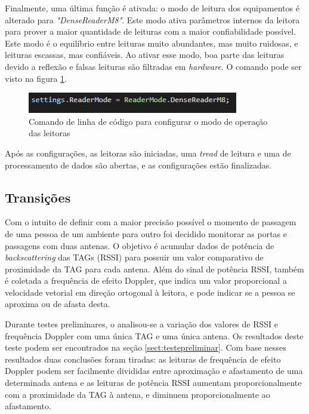   Finalmente, uma última função é ativada: o modo de leitura dos equipamentos é alterado para \textit{"DenseReaderM8"}. Este modo ativa parâmetros internos da leitora para prover a maior quantidade de leituras com a maior confiabilidade possível. Este modo é o equilíbrio entre leituras muito abundantes, mas muito ruidosas, e leituras escassas, mas confiáveis. Ao ativar esse modo, boa parte das leituras devido a reflexão e falsas leituras são filtradas em \textit{hardware}. O comando pode ser visto na figura \ref{fig:readermode_settings}.

 \begin{figure}[H]
    \centering
    \includegraphics[width=0.6\linewidth]{figs/Metodologia/readermode_settings.PNG}
    \caption{Comando de linha de código para configurar o modo de operação das leitoras}
    \label{fig:readermode_settings}
\end{figure}

  Após as configurações, as leitoras são iniciadas, uma \textit{tread} de leitura e uma de processamento de dados são abertas, e as configurações estão finalizadas.

 \subsection{Transições}
 
 Com o intuito de definir com a maior precisão possível o momento de passagem de uma pessoa de um ambiente para outro foi decidido monitorar as portas e passagens com duas antenas. O objetivo é acumular dados de potência de \textit{backscattering} das TAGs (RSSI) para possuir um valor comparativo de proximidade da TAG para cada antena. Além do sinal de potência RSSI, também é coletada a frequência de efeito Doppler, que indica um valor proporcional a velocidade vetorial em direção ortogonal à leitora, e pode indicar se a pessoa se aproxima ou de afasta desta.
 
 Durante testes preliminares, o analisou-se a variação dos valores de RSSI e frequência Doppler com uma única TAG e uma única antena. Os resultados deste teste podem ser encontrados na seção \ref{sect:testepreliminar}. Com base nesses resultados duas conclusões foram tiradas: as leituras de frequência de efeito Doppler podem ser facilmente divididas entre aproximação e afastamento de uma determinada antena e as leituras de potência RSSI aumentam proporcionalmente com a proximidade da TAG à antena, e diminuem proporcionalmente ao afastamento.
 
